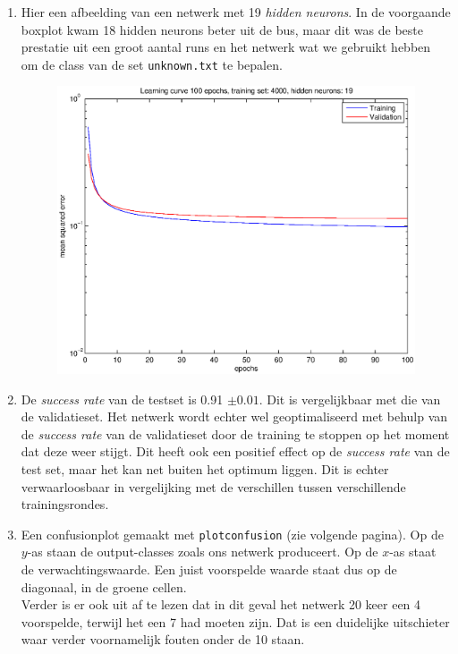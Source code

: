 \documentclass[a4paper,10pt,fleqn]{article}
\begin{document}
\begin{enumerate}[1.]
    \pagebreak
	\item Hier een afbeelding van een netwerk met 19 \textit{hidden neurons}. In de voorgaande boxplot kwam 18 hidden neurons beter uit de bus, maar dit was de beste prestatie uit een groot aantal runs en het netwerk wat we gebruikt hebben om de class van de set \verb|unknown.txt| te bepalen.
	\begin{figure}[!ht]
    	\centering
        \includegraphics[width=.8\textwidth]{images/learning_curve}
    \end{figure}

	\item De \textit{success rate} van de testset is 0.91 $\pm 0.01$. Dit is vergelijkbaar met die van de validatieset. Het netwerk wordt echter wel geoptimaliseerd met behulp van de \textit{success rate} van de validatieset door de training te stoppen op het moment dat deze weer stijgt. Dit heeft ook een positief effect op de \textit{success rate} van de test set, maar het kan net buiten het optimum liggen. Dit is echter verwaarloosbaar in vergelijking met de verschillen tussen verschillende trainingsrondes.

	\item Een confusionplot gemaakt met \verb|plotconfusion| (zie volgende pagina). Op de $y$-as staan de output-classes zoals ons netwerk produceert. Op de $x$-as staat de verwachtingswaarde. Een juist voorspelde waarde staat dus op de diagonaal, in de groene cellen.  \\
    Verder is er ook uit af te lezen dat in dit geval het netwerk 20 keer een 4 voorspelde, terwijl het een 7 had moeten zijn. Dat is een duidelijke uitschieter waar verder voornamelijk fouten onder de 10 staan.


\end{enumerate}
\end{document}
